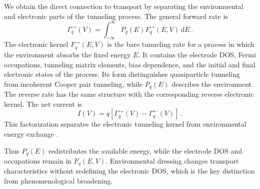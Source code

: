         We obtain the direct connection to transport by separating the environmental and electronic parts of the tunneling process. The general forward rate is
        \begin{equation}
            \Gamma_q^{\rightarrow}(V)
            = \int_{-\infty}^{\infty} P_q(E)F_q^{\rightarrow}(E,V)\,\mathrm{d}E\,.
            \label{eq:stochastic:pe-tunnel-rate}
        \end{equation}
        The electronic kernel $F_q^{\rightarrow}(E,V)$ is the bare tunneling rate for a process in which the environment absorbs the fixed energy $E$. It contains the electrode DOS, Fermi occupations, tunneling matrix elements, bias dependence, and the initial and final electronic states of the process. Its form distinguishes quasiparticle tunneling from incoherent Cooper pair tunneling, while $P_q(E)$ describes the environment. The reverse rate has the same structure with the corresponding reverse electronic kernel. The net current is
        \begin{equation}
            I(V)=q\left[\Gamma_q^{\rightarrow}(V)-\Gamma_q^{\leftarrow}(V)\right]\,.
            \label{eq:stochastic:pe-rate-current}
        \end{equation}
        This factorization separates the electronic tunneling kernel from environmental energy exchange \cite{falci_quasiparticle_1991,ingold_charge_1992}.

        Thus $P_q(E)$ redistributes the available energy, while the electrode DOS and occupations remain in $F_q(E,V)$. Environmental dressing changes transport characteristics without redefining the electronic DOS, which is the key distinction from phenomenological broadening.

